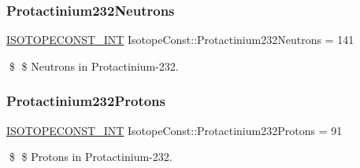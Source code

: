 \subsubsection{\texorpdfstring{Protactinium232\+Neutrons}{Protactinium232Neutrons}}
{\footnotesize\ttfamily \mbox{\hyperlink{group___isotope_const-_macros_ga5f18360b3e99483a35c32d789e62621c}{I\+S\+O\+T\+O\+P\+E\+C\+O\+N\+S\+T\+\_\+\+I\+NT}} Isotope\+Const\+::\+Protactinium232\+Neutrons = 141}

\$ \$ Neutrons in Protactinium-\/232. \mbox{\label{group___isotope_const-_protactinium-_pa232_gaeb654ec6e8e72a361ad00e3bd42efc10}} 
\subsubsection{\texorpdfstring{Protactinium232\+Protons}{Protactinium232Protons}}
{\footnotesize\ttfamily \mbox{\hyperlink{group___isotope_const-_macros_ga5f18360b3e99483a35c32d789e62621c}{I\+S\+O\+T\+O\+P\+E\+C\+O\+N\+S\+T\+\_\+\+I\+NT}} Isotope\+Const\+::\+Protactinium232\+Protons = 91}

\$ \$ Protons in Protactinium-\/232. 